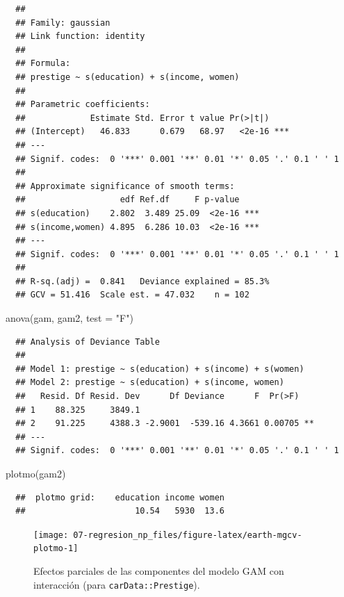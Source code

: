 \documentclass[
]{book}
\newenvironment{Shaded}{\begin{snugshade}}{\end{snugshade}}
\newcommand{\AttributeTok}[1]{\textcolor[rgb]{0.77,0.63,0.00}{#1}}
\newcommand{\FunctionTok}[1]{\textcolor[rgb]{0.00,0.00,0.00}{#1}}
\newcommand{\NormalTok}[1]{#1}
\newcommand{\StringTok}[1]{\textcolor[rgb]{0.31,0.60,0.02}{#1}}
\theoremstyle{break}
\theoremstyle{nonumberplain}
\begin{document}
\begin{verbatim}
  ## 
  ## Family: gaussian 
  ## Link function: identity 
  ## 
  ## Formula:
  ## prestige ~ s(education) + s(income, women)
  ## 
  ## Parametric coefficients:
  ##             Estimate Std. Error t value Pr(>|t|)    
  ## (Intercept)   46.833      0.679   68.97   <2e-16 ***
  ## ---
  ## Signif. codes:  0 '***' 0.001 '**' 0.01 '*' 0.05 '.' 0.1 ' ' 1
  ## 
  ## Approximate significance of smooth terms:
  ##                   edf Ref.df     F p-value    
  ## s(education)    2.802  3.489 25.09  <2e-16 ***
  ## s(income,women) 4.895  6.286 10.03  <2e-16 ***
  ## ---
  ## Signif. codes:  0 '***' 0.001 '**' 0.01 '*' 0.05 '.' 0.1 ' ' 1
  ## 
  ## R-sq.(adj) =  0.841   Deviance explained = 85.3%
  ## GCV = 51.416  Scale est. = 47.032    n = 102
\end{verbatim}

\begin{Shaded}
\begin{Highlighting}[]
\FunctionTok{anova}\NormalTok{(gam, gam2, }\AttributeTok{test =} \StringTok{"F"}\NormalTok{)}
\end{Highlighting}
\end{Shaded}

\begin{verbatim}
  ## Analysis of Deviance Table
  ## 
  ## Model 1: prestige ~ s(education) + s(income) + s(women)
  ## Model 2: prestige ~ s(education) + s(income, women)
  ##   Resid. Df Resid. Dev      Df Deviance      F  Pr(>F)   
  ## 1    88.325     3849.1                                   
  ## 2    91.225     4388.3 -2.9001  -539.16 4.3661 0.00705 **
  ## ---
  ## Signif. codes:  0 '***' 0.001 '**' 0.01 '*' 0.05 '.' 0.1 ' ' 1
\end{verbatim}

\begin{Shaded}
\begin{Highlighting}[]
\FunctionTok{plotmo}\NormalTok{(gam2)}
\end{Highlighting}
\end{Shaded}

\begin{verbatim}
  ##  plotmo grid:    education income women
  ##                      10.54   5930  13.6
\end{verbatim}

\begin{figure}[!htb]

{\centering \texttt{[image: 07-regresion\_np\_files/figure-latex/earth-mgcv-plotmo-1]} 

}

\caption{Efectos parciales de las componentes del modelo GAM con interacción (para \texttt{carData::Prestige}).}\label{fig:earth-mgcv-plotmo}
\end{figure}
\end{document}
